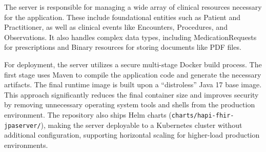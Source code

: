 The server is responsible for managing a wide array of clinical resources
necessary for the application. These include foundational entities such as
Patient and Practitioner, as well as clinical events like Encounters,
Procedures, and Observations. It also handles complex data types, including
MedicationRequests for prescriptions and Binary resources for storing documents
like PDF files.

For deployment, the server utilizes a secure multi-stage Docker build process.
The first stage uses Maven to compile the application code and generate the
necessary artifacts. The final runtime image is built upon a ``distroless''
Java 17 base image. This approach significantly reduces the final container
size and improves security by removing unnecessary operating system tools and
shells from the production environment. The repository also ships Helm charts
(\texttt{charts/hapi-fhir-jpaserver/}), making the server deployable to a
Kubernetes cluster without additional configuration, supporting horizontal
scaling for higher-load production environments.